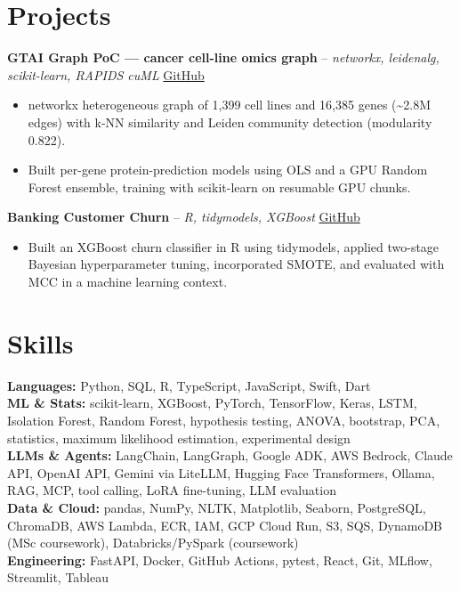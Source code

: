 \documentclass[a4paper,10pt]{article}
\begin{document}
\section{Projects}
\noindent\textbf{GTAI Graph PoC — cancer cell-line omics graph} -- \textit{networkx, leidenalg, scikit-learn, RAPIDS cuML} \hfill \href{https://github.com/Thiruvel-AP/GTAI-GraphPOC}{GitHub}
\begin{itemize}
  \item networkx heterogeneous graph of 1,399 cell lines and 16,385 genes (\textasciitilde{}2.8M edges) with k-NN similarity and Leiden community detection (modularity 0.822).
  \item Built per-gene protein-prediction models using OLS and a GPU Random Forest ensemble, training with scikit-learn on resumable GPU chunks.
\end{itemize}
\noindent\textbf{Banking Customer Churn} -- \textit{R, tidymodels, XGBoost} \hfill \href{https://github.com/Thiruvel-AP/Banking-Customer-Churn-Prediction}{GitHub}
\begin{itemize}
  \item Built an XGBoost churn classifier in R using tidymodels, applied two-stage Bayesian hyperparameter tuning, incorporated SMOTE, and evaluated with MCC in a machine learning context.
\end{itemize}

\section{Skills}
\textbf{Languages:} Python, SQL, R, TypeScript, JavaScript, Swift, Dart\\
\textbf{ML \& Stats:} scikit-learn, XGBoost, PyTorch, TensorFlow, Keras, LSTM, Isolation Forest, Random Forest, hypothesis testing, ANOVA, bootstrap, PCA, statistics, maximum likelihood estimation, experimental design\\
\textbf{LLMs \& Agents:} LangChain, LangGraph, Google ADK, AWS Bedrock, Claude API, OpenAI API, Gemini via LiteLLM, Hugging Face Transformers, Ollama, RAG, MCP, tool calling, LoRA fine-tuning, LLM evaluation\\
\textbf{Data \& Cloud:} pandas, NumPy, NLTK, Matplotlib, Seaborn, PostgreSQL, ChromaDB, AWS Lambda, ECR, IAM, GCP Cloud Run, S3, SQS, DynamoDB (MSc coursework), Databricks/PySpark (coursework)\\
\textbf{Engineering:} FastAPI, Docker, GitHub Actions, pytest, React, Git, MLflow, Streamlit, Tableau
\end{document}

